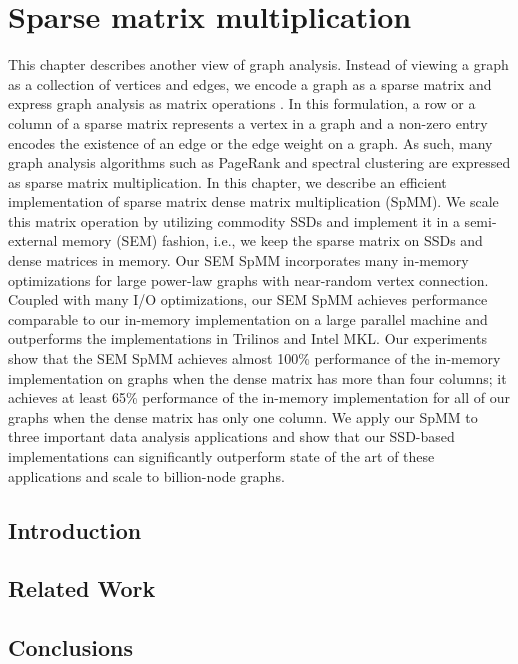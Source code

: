 \chapter{Sparse matrix multiplication}
\label{sec:fe}

This chapter describes another view of graph analysis. Instead of viewing
a graph as a collection of vertices and edges, we encode a graph as
a sparse matrix and express graph analysis as matrix operations \cite{Mattson13}.
In this formulation, a row or a column of a sparse matrix represents a vertex
in a graph and a non-zero entry encodes the existence of an edge or the edge
weight on a graph. As such, many graph analysis algorithms such as PageRank
and spectral clustering are expressed as sparse matrix multiplication.
In this chapter, we describe an efficient implementation of sparse matrix
dense matrix multiplication (SpMM). We scale this matrix operation by utilizing
commodity SSDs and implement it in
a semi-external memory (SEM) fashion, i.e., we keep the sparse matrix on SSDs
and dense matrices in memory. Our SEM SpMM incorporates many
in-memory optimizations for large power-law graphs with near-random vertex
connection. Coupled with many I/O optimizations, our SEM SpMM achieves performance
comparable to our in-memory implementation on a large parallel machine and
outperforms the implementations in Trilinos and Intel MKL.
Our experiments show that the SEM SpMM achieves almost 100\% performance
of the in-memory implementation on graphs when the dense matrix has more
than four columns; it achieves at least 65\% performance of the in-memory
implementation for all of our graphs when the dense matrix has only one column.
We apply our SpMM to three important data analysis applications and show that
our SSD-based implementations can significantly outperform state of the art
of these applications and scale to billion-node graphs.

\section{Introduction}


\section{Related Work}






\section{Conclusions}

